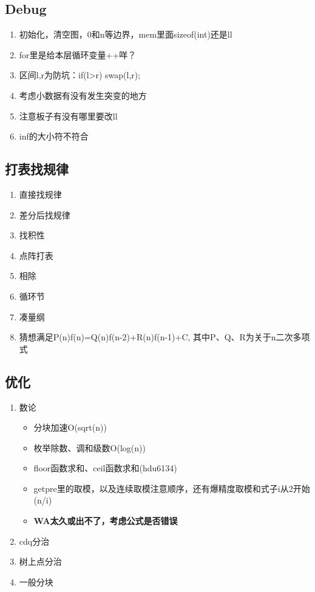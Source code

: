 \subsection{Debug}
  \begin{enumerate}
    \item 初始化，清空图，0和n等边界，mem里面sizeof(int)还是ll
    \item for里是给本层循环变量++咩？
    \item 区间l,r为防坑：if(l>r) swap(l,r);
    \item 考虑小数据有没有发生突变的地方
    \item 注意板子有没有哪里要改ll
    \item inf的大小符不符合
  \end{enumerate}

\subsection{打表找规律}
  \begin{enumerate}
    \item 直接找规律
    \item 差分后找规律
    \item 找积性
    \item 点阵打表
    \item 相除
    \item 循环节
    \item 凑量纲
    \item 猜想满足P(n)f(n)=Q(n)f(n-2)+R(n)f(n-1)+C, 其中P、Q、R为关于n二次多项式
  \end{enumerate}

\subsection{优化}
  \begin{enumerate}
    \item 数论
      \begin{itemize}
        \item 分块加速O(sqrt(n))
        \item 枚举除数、调和级数O(log(n))
        \item floor函数求和、ceil函数求和(hdu6134)
        \item getpre里的取模，以及连续取模注意顺序，还有爆精度取模和式子i从2开始(n/i)
        \item \textbf{WA太久或出不了，考虑公式是否错误}
      \end{itemize}
    \item cdq分治
    \item 树上点分治
    \item 一般分块
  \end{enumerate}
